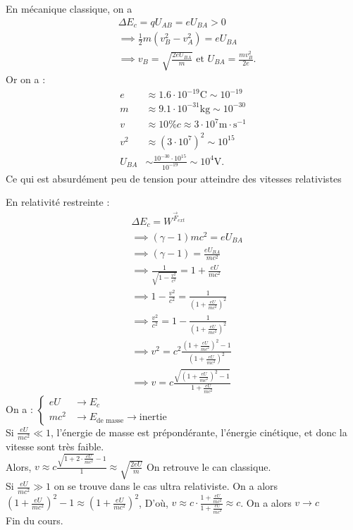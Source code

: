 \documentclass{article}
\begin{document}
En mécanique classique, on a
\begin{align*}
    &\Delta E_c = qU_{AB} = eU_{BA}>0\\
    &\implies \frac{1}{2}m(v_B^2-v_A^2) = eU_{BA}\\
    &\implies v_B = \sqrt{\frac{2eU_{BA}}{m}} \text{ et } U_{BA} = \frac{mv_B^2}{2e}
.\end{align*}
Or on a : \\
\begin{align*}
    e&\approx 1.6\cdot 10^{-19} \text{C} \sim 10^{-19}\\
    m&\approx 9.1 \cdot 10^{-31} \text{kg} \sim 10^{-30}\\
    v&\approx 10\% c \approx 3\cdot 10^{7} \text{m}\cdot \text{s}^{-1}\\
    v^2&\approx (3\cdot 10^{7})^2 \sim 10^{15}\\
    U_{BA} &\sim \frac{10^{-30}\cdot 10^{15}}{10^{-19}} \sim 10^{4} \text{V}
.\end{align*}
Ce qui est absurdément peu de tension pour atteindre des vitesses relativistes

En relativité restreinte : \\
\begin{align*}
    &\Delta E_c = W^{\vec{F}_{ext}}\\
    &\implies (\gamma -1)mc^2 = eU_{BA} \\
    &\implies(\gamma -1) = \frac{eU_{BA}}{mc^2} \\
    &\implies \frac{1}{\sqrt{1-\frac{v^2}{c^2}}} = 1+ \frac{eU}{mc^2} \\
    &\implies 1-\frac{v^2}{c^2} = \frac{1}{(1+\frac{eU}{mc^2})^2}\\
    &\implies \frac{v^2}{c^2} = 1-\frac{1}{(1+\frac{eU}{mc^2})^2} \\
    &\implies v^2 = c^2 \frac{(1+\frac{eU}{mc^2})^2-1}{(1+\frac{eU}{mc^2})^2} \\
    &\implies v = c \frac{\sqrt{(1+\frac{eU}{mc^2})^2-1} }{1+\frac{eU}{mc^2}}
\end{align*}
On a : \(\begin{cases}
    eU &\to E_c\\
    mc^2 &\to E_{\text{de masse}} \to \text{inertie}
\end{cases}\)\\
Si \(\frac{eU}{mc^2}\ll 1\), l'énergie de masse est prépondérante, l'énergie cinétique, et donc la vitesse sont très faible.\\
Alors, \(v\approx c \frac{\sqrt{1+ 2\cdot \frac{eU}{mc^2}}-1}{1} \approx \sqrt{\frac{2eU}{m}} \) On retrouve le can classique.\\
Si \(\frac{eU}{mc^2}\gg 1\) on se trouve dans le cas ultra relativiste. On a alors \((1+\frac{eU}{mc^2})^2-1 \approx (1+\frac{eU}{mc^2})^2\), D'où, \(v\approx c \cdot \frac{1+\frac{eU}{mc^2 }}{1+\frac{eU}{mc^2}} \approx c\). On a alors \(v\to c\)\\
Fin du cours.
\end{document}
